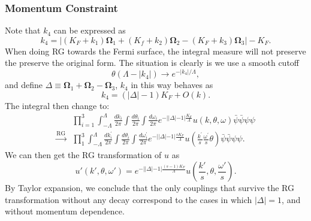 \subsubsection*{Momentum Constraint}
Note that $k_4$ can be expressed as
\begin{equation}
	k_4 = |(K_F+k_1)\bm \Omega_1+(K_f+k_2)\bm \Omega_2-(K_F+k_3)\bm \Omega_3|-K_F.
\end{equation}
When doing RG towards the Fermi surface, the integral measure will not preserve the preserve the original form.
The situation is clearly is we use a smooth cutoff
\begin{equation}
	\theta(\Lambda-|k_4|) \rightarrow e^{-|k_4|/\Lambda},
\end{equation}
and define $\Delta\equiv \bm \Omega_1+\bm \Omega_2-\bm \Omega_3$, $k_4$ in this way behaves as
\begin{equation}
	k_4 = (|\Delta|-1)K_F + O(k).
\end{equation}
The integral then change to:
\begin{equation}
\begin{aligned}
	& \prod_{i=1}^{3} \int_{-\Lambda}^{\Lambda} \frac{d k_{i}}{2\pi} 
		\int \frac{d \theta_{i}}{2 \pi} \int \frac{d \omega_{i}}{2 \pi} 
		e^{-||\Delta|-1|\frac{K_F}{\Lambda}} u(k,\theta,\omega) 
		\bar\psi \bar\psi \psi \psi \\
	\overset{\mathrm{RG}}{\longrightarrow} & \prod_{1}^{3} \int_{-\Lambda}^{\Lambda}
		\frac{d k_{i}^{\prime}}{2 \pi} 
		\int \frac{d \theta_{i}}{2 \pi} 
		\int \frac{d \omega_{i}^{\prime}}{2 \pi} 
		e^{-|| \Delta|-1|\frac{sK_F}{\Lambda}} 
		u\left(\frac{k^{\prime}}{s} \frac{\omega^{\prime}}{s} \theta\right) 
		\bar\psi \bar\psi \psi \psi.
\end{aligned}
\end{equation}
We can then get the RG transformation of $u$ as
\begin{equation}
	u'(k',\theta,\omega') = e^{-||\Delta|-1|\frac{(s-1)K_F}{\Lambda}}u\left(\frac{k'}{s},\theta,\frac{\omega'}{s}\right).
\end{equation}
By Taylor expansion, we conclude that the only couplings that survive the RG transformation without any decay correspond to the cases in which $|\Delta|=1$, and without momentum dependence.

